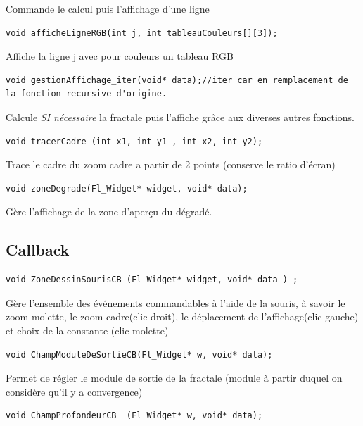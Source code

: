 \documentclass[a4paper,11pt]{article} \usepackage[T1]{fontenc} \usepackage[utf8]{inputenc} \usepackage[francais]{babel}
\begin{document}
Commande le calcul puis l'affichage d'une ligne

\begin{lstlisting}
void afficheLigneRGB(int j, int tableauCouleurs[][3]);\end{lstlisting}

Affiche la ligne j avec pour couleurs un tableau RGB

\begin{lstlisting}
void gestionAffichage_iter(void* data);//iter car en remplacement de la fonction recursive d'origine.\end{lstlisting}

Calcule \emph{SI nécessaire} la fractale puis l'affiche grâce aux diverses autres fonctions.

\begin{lstlisting}
void tracerCadre (int x1, int y1 , int x2, int y2);\end{lstlisting}

Trace le cadre du zoom cadre a partir de 2 points (conserve le ratio d'écran)

\begin{lstlisting}
void zoneDegrade(Fl_Widget* widget, void* data);\end{lstlisting}

Gère l'affichage de la zone d’aperçu du dégradé.\\

\subsection{Callback}
\begin{lstlisting}
void ZoneDessinSourisCB (Fl_Widget* widget, void* data ) ;\end{lstlisting}

Gère l'ensemble des événements commandables à l'aide de la souris, à savoir le zoom molette, le zoom cadre(clic droit), le déplacement de l'affichage(clic gauche) et choix de la constante (clic molette)

\begin{lstlisting}
void ChampModuleDeSortieCB(Fl_Widget* w, void* data);\end{lstlisting}

Permet de régler le module de sortie de la fractale (module à partir duquel on considère qu'il y a convergence)

\begin{lstlisting}
void ChampProfondeurCB  (Fl_Widget* w, void* data);\end{lstlisting}
\end{document}
